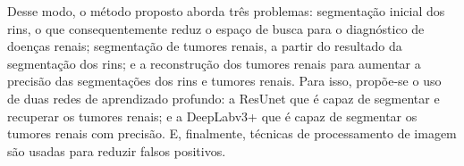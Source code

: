 Desse modo, o método proposto aborda três problemas: segmentação inicial dos rins, o que consequentemente reduz o espaço de busca para o diagnóstico de doenças renais; segmentação de tumores renais, a partir do resultado da segmentação dos rins; e a reconstrução dos tumores renais para aumentar a precisão das segmentações dos rins e tumores renais. Para isso, propõe-se o uso de duas redes de aprendizado profundo: a ResUnet que é capaz de segmentar e recuperar os tumores renais; e a DeepLabv3+ que é capaz de segmentar os tumores renais com precisão. E, finalmente, técnicas de processamento de imagem são usadas para reduzir falsos positivos.

\begin{table}[!ht]
\caption{Resumo dos trabalhos relacionados.}
\label{tab:trabalhos-relacionados}
\doublespacing
\centering
{}
\end{table}
